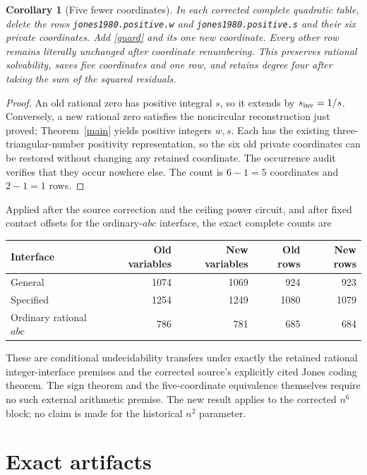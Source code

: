 \documentclass[11pt]{article}
\newtheorem{corollary}[theorem]{Corollary}
\begin{document}
\begin{corollary}[Five fewer coordinates]\label{saving}
In each corrected complete quadratic table, delete the rows
\texttt{jones1980.positive.w} and \texttt{jones1980.positive.s}
and their six private coordinates. Add \eqref{guard} and its one
new coordinate. Every other row remains literally unchanged after
coordinate renumbering. This preserves rational solvability, saves
five coordinates and one row, and retains degree four after taking
the sum of the squared residuals.
\end{corollary}
\begin{proof}
An old rational zero has positive integral \(s\), so it extends by
\(s_{\rm inv}=1/s\). Conversely, a new rational zero satisfies the
noncircular reconstruction just proved; Theorem~\ref{main} yields
positive integers \(w,s\). Each has the existing three-triangular-number
positivity representation, so the six old private coordinates can be
restored without changing any retained coordinate. The occurrence
audit verifies that they occur nowhere else. The count is
\(6-1=5\) coordinates and \(2-1=1\) rows.
\end{proof}

Applied after the source correction and the ceiling power circuit,
and after fixed contact offsets for the ordinary-\(abc\) interface,
the exact complete counts are
\begin{center}
\begin{tabular}{lrrrr}
\toprule
Interface & Old variables & New variables & Old rows & New rows\\
\midrule
General &1074&1069&924&923\\
Specified &1254&1249&1080&1079\\
Ordinary rational \(abc\)&786&781&685&684\\
\bottomrule
\end{tabular}
\end{center}
These are conditional undecidability transfers under exactly the
retained rational integer-interface premises and the corrected source's
explicitly cited Jones coding theorem. The sign theorem and the
five-coordinate equivalence themselves require no such external
arithmetic premise. The new result applies to the corrected \(n^6\)
block; no claim is made for the historical \(n^2\) parameter.

\section{Exact artifacts}
\end{document}

